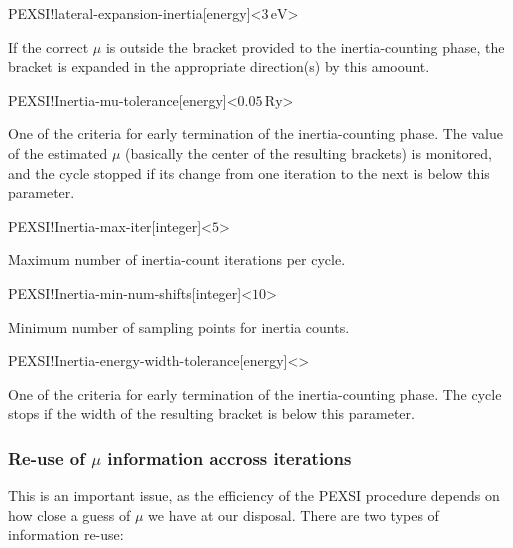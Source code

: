 \begin{fdfentry}{PEXSI!lateral-expansion-inertia}[energy]<$3\,\mathrm{eV}$>

  If the correct $\mu$ is outside the bracket provided to the
  inertia-counting phase, the bracket is expanded in the appropriate
  direction(s) by this amoount.

\end{fdfentry}

\begin{fdfentry}{PEXSI!Inertia-mu-tolerance}[energy]<$0.05\,\mathrm{Ry}$>

  One of the criteria for early termination of the inertia-counting
  phase.  The value of the estimated $\mu$ (basically the center of
  the resulting brackets) is monitored, and the cycle stopped if its
  change from one iteration to the next is below this parameter.
  
\end{fdfentry}

\begin{fdfentry}{PEXSI!Inertia-max-iter}[integer]<$5$>

  Maximum number of inertia-count iterations per cycle.

\end{fdfentry}

\begin{fdfentry}{PEXSI!Inertia-min-num-shifts}[integer]<$10$>
  
  Minimum number of sampling points for inertia counts.

\end{fdfentry}

\begin{fdfentry}{PEXSI!Inertia-energy-width-tolerance}[energy]<>

  One of the criteria for early termination of the inertia-counting
  phase.  The cycle stops if the width of the resulting bracket is
  below this parameter.
  
\end{fdfentry}


\subsubsection{Re-use of \texorpdfstring{$\mu$}{u} information accross iterations}

This is an important issue, as the efficiency of the PEXSI procedure
depends on how close a guess of $\mu$ we have at our
disposal. There are two types of information re-use:

